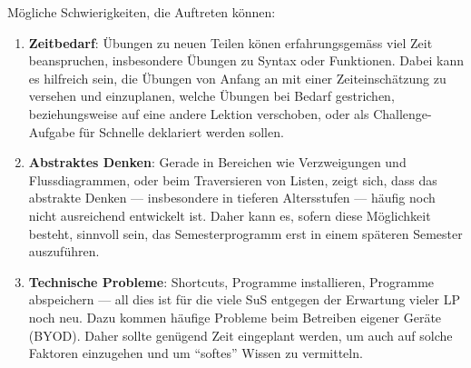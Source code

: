 Mögliche Schwierigkeiten, die Auftreten können:
\begin{enumerate}
\item \textbf{Zeitbedarf}: Übungen zu neuen Teilen könen erfahrungsgemäss viel Zeit beanspruchen, insbesondere Übungen zu Syntax oder Funktionen. Dabei kann es hilfreich sein, die Übungen von Anfang an mit einer Zeiteinschätzung zu versehen und einzuplanen, welche Übungen bei Bedarf gestrichen, beziehungsweise auf eine andere Lektion verschoben, oder als Challenge-Aufgabe für Schnelle deklariert werden sollen.
\item \textbf{Abstraktes Denken}: Gerade in Bereichen wie Verzweigungen und Flussdiagrammen, oder beim Traversieren von Listen, zeigt sich, dass das abstrakte Denken --- insbesondere in tieferen Altersstufen --- häufig noch nicht ausreichend entwickelt ist. Daher kann es, sofern diese Möglichkeit besteht, sinnvoll sein, das Semesterprogramm erst in einem späteren Semester auszuführen.
\item \textbf{Technische Probleme}: Shortcuts, Programme installieren, Programme abspeichern --- all dies ist für die viele SuS entgegen der Erwartung vieler LP noch neu. Dazu kommen häufige Probleme beim Betreiben eigener Geräte (BYOD). Daher sollte genügend Zeit eingeplant werden, um auch auf solche Faktoren einzugehen und um ``softes'' Wissen zu vermitteln.
\end{enumerate}

\clearpage
\tableofcontents
\clearpage
